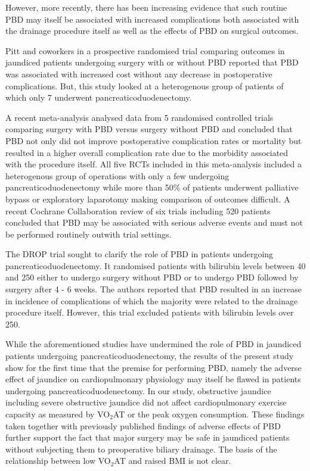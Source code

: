 However, more recently, there has been increasing evidence that such routine PBD may itself be associated with increased complications both associated with the drainage procedure itself as well as the effects of PBD on surgical outcomes.

Pitt and coworkers in a prospective randomised trial comparing outcomes in jaundiced patients undergoing surgery with or without PBD reported that PBD was associated with increased cost without any decrease in postoperative complications.\parencite{pitt_does_1985} But, this study looked at a heterogenous group of patients of which only 7 underwent pancreaticoduodenectomy.

A recent meta-analysis\parencite{sewnath_meta-analysis_2002} analysed data from 5 randomised controlled trials comparing surgery with PBD versus surgery without PBD and concluded that PBD not only did not improve postoperative complication rates or mortality but resulted in a higher overall complication rate due to the morbidity associated with the procedure itself. All five RCTs included in this meta-analysis included a heterogenous group of operations with only a few undergoing pancreaticoduodenectomy while more than 50\% of patients underwent palliative bypass or exploratory laparotomy making comparison of outcomes difficult. A recent Cochrane Collaboration review of six trials including 520 patients concluded that PBD may be associated with serious adverse events and must not be performed routinely outwith trial settings.\parencite{wang_preoperative_2008}

The DROP trial sought to clarify the role of PBD in patients undergoing pancreaticoduodenectomy.\parencite{van_der_gaag_preoperative_2010} It randomised patients with bilirubin levels between 40 and 250 either to undergo surgery without PBD or to undergo PBD followed by surgery after 4 - 6 weeks. The authors reported that PBD resulted in an increase in incidence of complications of which the majority were related to the drainage procedure itself. However, this trial excluded patients with bilirubin levels over 250.

While the aforementioned studies have undermined the role of PBD in jaundiced patients undergoing pancreaticoduodenectomy, the results of the present study show for the first time that the premise for performing PBD, namely the adverse effect of jaundice on cardiopulmonary physiology may itself be flawed in patients undergoing pancreaticoduodenectomy. In our study, obstructive jaundice including severe obstructive jaundice did not affect cardiopulmonary exercise capacity as measured by VO$_2$AT or the peak oxygen consumption. These findings taken together with previously published findings of adverse effects of PBD further support the fact that major surgery may be safe in jaundiced patients without subjecting them to preoperative biliary drainage. 
The basis of the relationship between low VO$_2$AT and raised BMI is not clear. 

